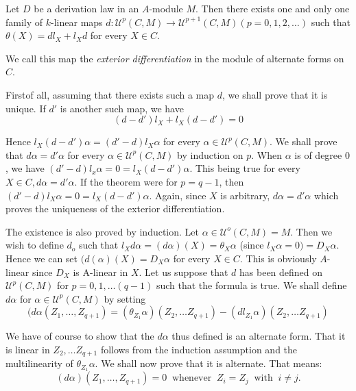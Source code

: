 \begin{theorem}\label{chap1:sec6:thm2} %
  Let $D$  be a derivation law in an $A$-module $M$. Then there exists
  one and only one family of $k$-linear maps $d: \mathscr{U}^p(C,M)
  \to \mathscr{U}^{p+1}(C,M) (p=0,1,2, \ldots)$ such that $\theta (X)
  =  dl_X + l_X d$ for every $X \in C$. 
\end{theorem} 
 
 We call this map the \textit{exterior differentiation} in the module
 of alternate forms on $C$. 
  
 First\pageoriginale of all, assuming  that there exists such a map $d$, we shall
 prove that it is unique. If $d'$ is another such map, we have  
 $$
 (d-d') l_X +l_X (d-d') =0
 $$ 
 
 Hence $l_X(d-d') \alpha = (d' - d) l_X \alpha$ for every $\alpha \in
 \mathscr{U}^p (C,M)$.  We shall prove that $d \alpha= d' \alpha$ for
 every $\alpha \in  \mathscr{U}^p(C,M)$ by induction on $p$. When
 $\alpha$ is of degree $0$, we have $(d' -d)l_x \alpha =0 = l_X (d-d')
 \alpha$. This being true for every $X \in C, d \alpha = d'
 \alpha$. If the theorem were for $p =q-1$, then $(d' -d) l_X \alpha =
 0 = l_X (d-d') \alpha$. Again, since $X$ is arbitrary, $d \alpha =
 d' \alpha$ which proves the uniqueness of the exterior
 differentiation. 
 
 The existence is also proved by induction. Let $\alpha \in
 \mathscr{U}^o (C,M)=M$. Then we wish to define $d_o$ such that $l_X d
 \alpha = (d \alpha)(X) = \theta_X \alpha$ (since $l_X \alpha =0) =
 D_X \alpha$. Hence we can set $(d(\alpha) (X)= D_X \alpha$ for every
 $X \in C$. This is obviously $A$-linear since $D_X$ is A-linear in
 $X$. Let us suppose that $d$ has been defined on $\mathscr{U}^p
 (C,M)$  for $p= 0,1, \ldots (q-1)$ such that the formula is true. We
 shall define $d \alpha$ for $\alpha \in  \mathscr{U}^p(C,M)$ by
 setting  
 $$
 (d \alpha(Z_1, \ldots , Z_{q+1}) = (\theta_{Z_1}\alpha) (Z_2 , \ldots
 Z_{q+1})-  (d l_{Z_1}\alpha) ( Z_2,  \ldots  Z_{q+1}) 
 $$
 
 We have of course to show that the $d \alpha$ thus defined is an
 alternate form. That it is linear in  $Z_2,  \ldots  Z_{q+1}$ follows
 from the induction assumption and the multilinearity of $\theta_{Z_1}
 \alpha$. We shall now prove that it is alternate. That means: 
 $$
 (d \alpha)(Z_1, \ldots , Z_{q+1}) =0  ~\text{ whenever } ~ Z_i = Z_j
 ~ \text{ with } ~ i \neq j.  
 $$
 
